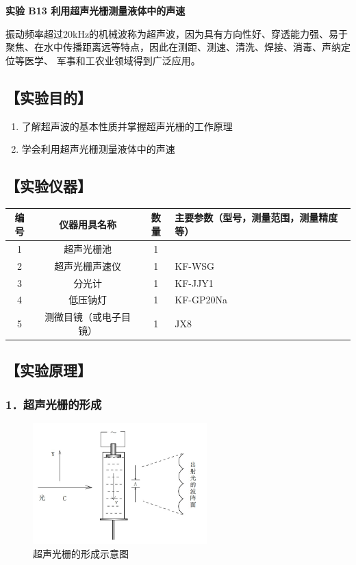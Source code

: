 \documentclass[12pt,a4paper,UTF8]{ctexart}
\begin{document}
\begin{center}
\LARGE\textbf{实验 B13 利用超声光栅测量液体中的声速}
\end{center}




振动频率超过20kHz的机械波称为超声波，因为具有方向性好、穿透能力强、易于聚焦、在水中传播距离远等特点，因此在测距、测速、清洗、焊接、消毒、声纳定位等医学、
军事和工农业领域得到广泛应用。

\subsection*{【实验目的】}
	\begin{enumerate}
		\item 了解超声波的基本性质并掌握超声光栅的工作原理
		\item 学会利用超声光栅测量液体中的声速
	\end{enumerate}

\subsection*{【实验仪器】}
\begin{table}[htbp]
	\centering
    \begin{tabular}{cccp{20em}}
	\toprule
	编号    & 仪器用具名称 & 数量    & 主要参数（型号，测量范围，测量精度等） \\
	\midrule
	1     & 超声光栅池 & 1     & \\
	2     &超声光栅声速仪 & 1 & KF-WSG \\
	3     & 分光计 & 1 & KF-JJY1\\
	4     & 低压钠灯 & 1 & KF-GP20Na\\
	5     & 测微目镜（或电子目镜）& 1 & JX8\\ 
	\bottomrule
	\end{tabular}%
	\label{tab:device}%
\end{table}%

\subsection*{【实验原理】}
\subsubsection*{1．超声光栅的形成}

\begin{figure}[htbp]
	\centering
	\includegraphics[width=0.6\textwidth]{img//1.jpg}
	\caption{超声光栅的形成示意图}
\end{figure}
\end{document}
